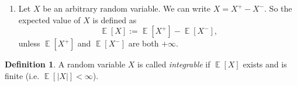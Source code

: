 \documentclass[12pt,a4paper]{report}
\theoremstyle{definition}
\newtheorem{definition}[theorem]{Definition}
\theoremstyle{num.custom-title}
\DeclareMathOperator{\E}{\mathbb{E}}
\DeclareMathOperator{\N}{\mathbb{N}}
\DeclareMathOperator{\imp}{\Rightarrow}
\renewcommand{\1}{\mathbbm{1}}
\renewcommand{\P}{\mathbb{P}}
\begin{document}
\begin{enumerate}
\textbf{Corollary.}
\begin{enumerate}
\item By monotone convergence we immediately have
\[
\E[X] = \lim_{n \to \infty} \sum_{k=0}^{n2^n-1} \frac{k}{2^n} \P \left[ \frac{k}{2^n} \leq X < \frac{k+1}{2^n} \right] + n \P \left[ X \geq n \right].
\]
\item If $\P[X=+\infty]>0$, then $\E[X]=+\infty$. This is because $\P[X \geq n] \nearrow \P[X = \infty]$.
\item If $E[X]<+\infty$, then $n\P[X \geq n] \to 0$.
\begin{proof}
First observe that $Y_n \leq Y_{n+1}$ for all $n \in \N$. Now, if $X(\omega) < \infty$, then $\exists n_0 \in \N$ s.t. $X(\omega) \geq n_0$. So $n \1_{[X_n \geq n]}(\omega)=0$ for all $n > n_0$, i.e. $X(\omega) = \lim_n Y_n(\omega)$. Thus $Y_n \nearrow X \cdot \1_{[X<+\infty]}$ almost surely, because by (b) we have $\E[X]<+\infty \imp \P[X<+\infty]=1$.\\
Therefore $Y_n \leq X_n \leq X$, and hence by monotone convergence we obtain $\E[Y_n] \to \E[X]$ and $\E[X_n] \to \E[X]$. Since $\E[X]<+\infty$, we can finally conclude that $\E[X_n] - \E[Y_n] \to 0$, i.e. $n\P[X \geq n] \to 0$.
\end{proof}
\end{enumerate}
\item Let $X$ be an arbitrary random variable. We can write $X = X^+-X^-$. So the expected value of $X$ is defined as
\[
\E[X]:=\E[X^+]-\E[X^-],
\]
unless $\E[X^+]$ and $\E[X^-]$ are both $+\infty$.
\end{enumerate}

\begin{definition}
A random variable $X$ is called \emph{integrable} if $\E[X]$ exists and is finite (i.e. $\E[|X|] < \infty$).
\end{definition}
\end{document}
